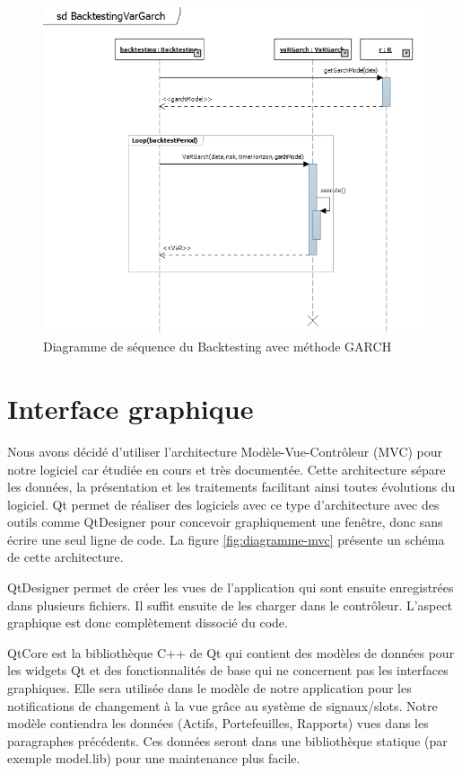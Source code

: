 \documentclass[a4paper,titlepage,french]{report}
\begin{document}
\begin{figure}
	\center
	\includegraphics[scale=0.8]{diagramme_sequence_backtesting.png}
    \caption{Diagramme de séquence du Backtesting avec méthode GARCH}
    \label{fig:diagramme-sequence-backtesting-garch}
\end{figure}


\section{Interface graphique}

Nous avons décidé d'utiliser l'architecture Modèle-Vue-Contrôleur (MVC) pour notre logiciel car étudiée en cours et très documentée.
Cette architecture sépare les données, la présentation et les traitements facilitant ainsi toutes évolutions du logiciel.
Qt permet de réaliser des logiciels avec ce type d'architecture avec des outils comme QtDesigner pour concevoir graphiquement une fenêtre, donc sans écrire une seul ligne de code.
La figure \ref{fig:diagramme-mvc} présente un schéma de cette architecture.

QtDesigner permet de créer les vues de l'application qui sont ensuite enregistrées dans plusieurs fichiers.
Il suffit ensuite de les charger dans le contrôleur.
L'aspect graphique est donc complètement dissocié du code.

QtCore est la bibliothèque C++ de Qt qui contient des modèles de données pour les widgets Qt et des fonctionnalités de base qui ne concernent pas les interfaces graphiques. Elle sera utilisée dans le modèle de notre application pour les notifications de changement à la vue grâce au système de signaux/slots. Notre modèle contiendra les données (Actifs, Portefeuilles, Rapports) vues dans les paragraphes précédents. Ces données seront dans une bibliothèque statique (par exemple model.lib) pour une maintenance plus facile.
\end{document}
